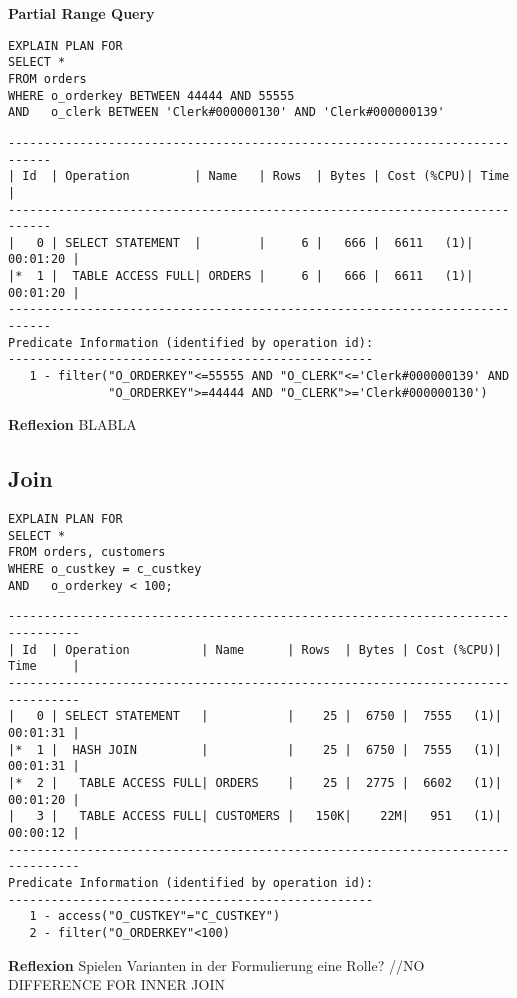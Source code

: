 \documentclass[10pt]{article}
\begin{document}
\textbf{Partial Range Query}
\begin{lstlisting}[style=sqlNoTitle]
EXPLAIN PLAN FOR
SELECT *
FROM orders
WHERE o_orderkey BETWEEN 44444 AND 55555
AND   o_clerk BETWEEN 'Clerk#000000130' AND 'Clerk#000000139'
\end{lstlisting}
\begin{lstlisting}[style=queryexecutionplan]
----------------------------------------------------------------------------
| Id  | Operation         | Name   | Rows  | Bytes | Cost (%CPU)| Time     |
----------------------------------------------------------------------------
|   0 | SELECT STATEMENT  |        |     6 |   666 |  6611   (1)| 00:01:20 |
|*  1 |  TABLE ACCESS FULL| ORDERS |     6 |   666 |  6611   (1)| 00:01:20 |
----------------------------------------------------------------------------
Predicate Information (identified by operation id):
---------------------------------------------------
   1 - filter("O_ORDERKEY"<=55555 AND "O_CLERK"<='Clerk#000000139' AND 
              "O_ORDERKEY">=44444 AND "O_CLERK">='Clerk#000000130')
\end{lstlisting}
\textbf{Reflexion} \newline
BLABLA

\subsection{Join}
\begin{lstlisting}[style=sqlNoTitle]
EXPLAIN PLAN FOR
SELECT *
FROM orders, customers
WHERE o_custkey = c_custkey
AND   o_orderkey < 100;
\end{lstlisting}
\begin{lstlisting}[style=queryexecutionplan]
--------------------------------------------------------------------------------
| Id  | Operation          | Name      | Rows  | Bytes | Cost (%CPU)| Time     |
--------------------------------------------------------------------------------
|   0 | SELECT STATEMENT   |           |    25 |  6750 |  7555   (1)| 00:01:31 |
|*  1 |  HASH JOIN         |           |    25 |  6750 |  7555   (1)| 00:01:31 |
|*  2 |   TABLE ACCESS FULL| ORDERS    |    25 |  2775 |  6602   (1)| 00:01:20 |
|   3 |   TABLE ACCESS FULL| CUSTOMERS |   150K|    22M|   951   (1)| 00:00:12 |
--------------------------------------------------------------------------------
Predicate Information (identified by operation id):
---------------------------------------------------
   1 - access("O_CUSTKEY"="C_CUSTKEY")
   2 - filter("O_ORDERKEY"<100)
\end{lstlisting}
\textbf{Reflexion} \newline
Spielen Varianten in der Formulierung eine Rolle?
//NO DIFFERENCE FOR INNER JOIN
\end{document}
